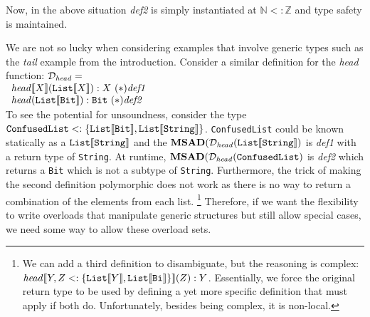 \documentclass[preprint]{sigplanconf}
\newcommand{\ob}[1]{\ensuremath{\llbracket {#1} \rrbracket}}
\begin{document}
Now, in the above situation {\it def2} is simply instantiated at $\mathbb{N} <: \mathbb{Z}$ and type safety is maintained.

We are not so lucky when considering examples that involve generic types such as the {\it tail} example from
the introduction.  Consider a similar definition for the {\it head} function: $\mathcal{D}_{{\it head}}=$\\

$\begin{array}{l}
{\it head}\ob{X}({\tt List}\ob{X}) :X~(*){\it def1}\\
{\it head}({\tt List}\ob{{\tt Bit}}) : {\tt Bit}~(*){\it def2}\\
\end{array}$\\

To see the potential for unsoundness, consider the type
${\tt ConfusedList} <: \{{\tt List}\ob{{\tt Bit}}, {\tt List}\ob{{\tt String}}\}$.  {\tt ConfusedList} could
be known statically as a ${\tt List}\ob{{\tt String}}$ and the ${\bf MSAD}(\mathcal{D}_{{\it head}}({\tt List}\ob{{\tt String}})$
is {\it def1} with a return type of {\tt String}.  At runtime,  ${\bf MSAD}(\mathcal{D}_{{\it head}}({\tt ConfusedList})$
is {\it def2} which returns a {\tt Bit} which is not a subtype of {\tt String}. Furthermore, the trick of making
the second definition polymorphic does not work as there is no way to return a combination of the elements
from each list. \footnote{We can add a third definition to disambiguate, but the reasoning is complex: 
${\it head}\ob{Y, Z <: \{ {\tt List}\ob{Y}, {\tt List}\ob{{\tt Bi}}\}}(Z) : Y$.  Essentially, we force the original return type
to be used by defining a yet more specific definition that must apply if both do.  Unfortunately, besides being
complex, it is non-local.}  Therefore, if we want the flexibility to write overloads that manipulate generic structures but
still allow special cases, we need some way to allow these overload sets.

\end{document}
